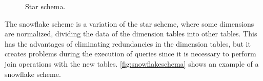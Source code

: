 \begin{figure}[!htb]
  \caption{Star schema.}\label{fig:starschema}
  \vspace{6mm}
  \begin{center}
  \end{center}
  \vspace{1mm}
  \legenda{}
\end{figure}

The snowflake scheme is a variation of the star scheme, where some dimensions are normalized, dividing the data of the dimension tables into other tables.
This has the advantages of eliminating redundancies in the dimension tables, but it creates problems during the execution of queries since it is necessary to perform join operations with the new tables.
\autoref{fig:snowflakeschema} shows an example of a snowflake scheme.

